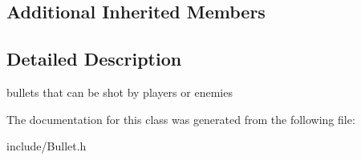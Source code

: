 \subsection*{Additional Inherited Members}


\subsection{Detailed Description}
bullets that can be shot by players or enemies 

The documentation for this class was generated from the following file\+:\begin{DoxyCompactItemize}
\item 
include/Bullet.\+h\end{DoxyCompactItemize}
